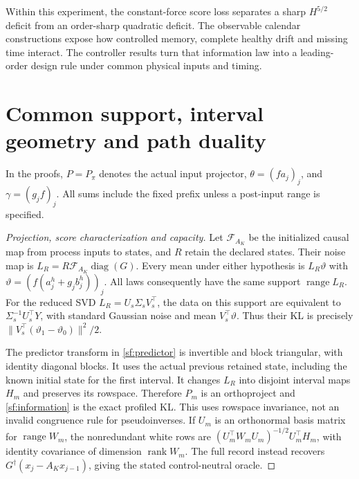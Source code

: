 \documentclass[journal]{IEEEtran}
\begin{document}
Within this experiment, the constant-force score loss separates a sharp
$H^{5/2}$ deficit from an order-sharp quadratic deficit. The observable
calendar constructions expose how controlled memory, complete healthy drift
and missing time interact. The controller results turn that information law
into a leading-order design rule under common physical inputs and timing.

\appendices
\section{Common support, interval geometry and path duality}\label{sf:geometry}
In the proofs, $P=P_\pi$ denotes the actual input projector,
$\theta=(fa_j)_j$, and $\gamma=(g_jf)_j$. All sums include the fixed prefix
unless a post-input range is specified.
\begin{proof}[Projection, score characterization and capacity]\leavevmode
Let $\mathcal F_{A_K}$ be the initialized causal map from process
inputs to states, and $R$ retain the declared states. Their noise map is
$L_R=R\mathcal F_{A_K}\operatorname{diag}(G)$.
Every mean under either hypothesis is $L_R\vartheta$ with
$\vartheta=(f(a_j^h+g_jb_j^h))_j$. All laws consequently have the
same support $\operatorname{range}L_R$.
For the reduced SVD $L_R=U_s\Sigma_sV_s^\top$, the data on this support
are equivalent to $\Sigma_s^{-1}U_s^\top Y$, with standard Gaussian
noise and mean $V_s^\top\vartheta$. Thus their KL is precisely
$\|V_s^\top(\vartheta_1-\vartheta_0)\|^2/2$.

The predictor transform in \eqref{sf:predictor} is invertible and
block triangular, with identity diagonal blocks. It uses the actual previous
retained state, including the known initial state for the first interval.
It changes $L_R$ into disjoint interval maps $H_m$ and preserves its
rowspace. Therefore $P_m$ is an orthoproject and
\eqref{sf:information} is the exact profiled KL.
This uses rowspace invariance, not an invalid congruence rule for
pseudoinverses. If $U_m$ is an orthonormal basis matrix for $\operatorname{range}W_m$, the
nonredundant white rows are
$(U_m^\top W_mU_m)^{-1/2}U_m^\top H_m$, with identity covariance
of dimension $\operatorname{rank}W_m$.
The full record instead recovers
$G^\dagger(x_j-A_Kx_{j-1})$, giving the stated control-neutral oracle.


\end{proof}
\end{document}
